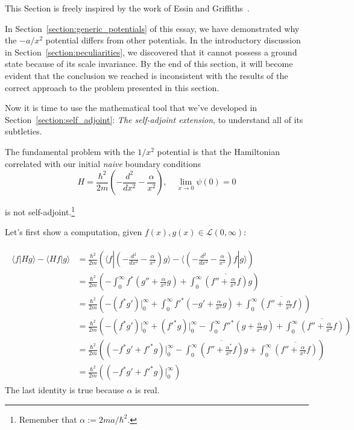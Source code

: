 This Section is freely inspired by the work of Essin and Griffiths~\cite{EssinGriffiths:10.1119/1.2165248}.

In Section~\ref{section:generic_potentials} of this essay, we have demonstrated why the $-a/x^2$ potential differs from other potentials. In the introductory discussion in Section~\ref{section:peculiarities}, we discovered that it cannot possess a ground state because of its scale invariance. By the end of this section, it will become evident that the conclusion we reached is inconsistent with the results of the correct approach to the problem presented in this section.

\vspace{4mm}
\noindent
Now it is time to use the mathematical tool that we've developed in Section~\ref{section:self_adjoint}: \textit{The self-adjoint extension}, to understand all of its subtleties.

\vspace{4mm}
\noindent
The fundamental problem with the $1/x^2$ potential is that the Hamiltonian correlated with our initial \textit{naive} boundary conditions
\begin{equation}
    H =  \frac{\hbar^2}{2m} \left(-\frac{d^2}{dx^2} - \frac{\alpha}{x^2}\right), \quad \lim_{x \to 0} \psi(0) = 0
    \label{eq:naive_BC}
\end{equation}

is not self-adjoint.\footnote{Remember that $\alpha := 2ma/\hbar^2$.}

\vspace{4mm}
\noindent
Let's first show a computation, given $f(x),g(x) \in \mathcal{L}(0,\infty)$:

\begin{align}
    \begin{split}
        \langle f | H g \rangle - \langle H f |  g \rangle
         & = \frac{\hbar^2}{2m} \left(\langle f | (- \frac{d^2}{dx^2} - \frac{\alpha}{x^2}) g \rangle - \langle (- \frac{d^2}{dx^2} - \frac{\alpha}{x^2}) f |  g \rangle\right)                                         \\
         & =  \frac{\hbar^2}{2m} \left(- \int_0^\infty f^* (g''+ \frac{\alpha}{x^2}g) + \int_0^\infty \overline{(f'' + \frac{\alpha}{x^2}f)} g\right)   \\
         & =  \frac{\hbar^2}{2m} \left(- (f^* g')\bigg|_0^\infty + \int_0^\infty f'^* (- g' + \frac{\alpha}{x^2}g) + \int_0^\infty \overline{(f'' + \frac{\alpha}{x^2}f)}\right)                          \\
         & = \frac{\hbar^2}{2m} \left(- (f^* g')\bigg|_0^\infty + (f'^* g)\bigg|_0^\infty - \int_0^\infty f''^* ( g + \frac{\alpha}{x^2}g) + \int_0^\infty \overline{(f'' + \frac{\alpha}{x^2}f)}\right) \\
         & =  \frac{\hbar^2}{2m} \left((- f^* g' + f'^* g)\bigg|_0^\infty - \int_0^\infty \overline{(f''  + \frac{\alpha^*}{x^2}f)}g + \int_0^\infty \overline{(f'' + \frac{\alpha}{x^2}f)}\right) \\
         & = \frac{\hbar^2}{2m} \left((- f^* g' + f'^* g)\bigg|_0^\infty\right)
    \end{split}
    \label{eq:potential_symmetry}
\end{align}
The last identity is true because $\alpha$ is real.

